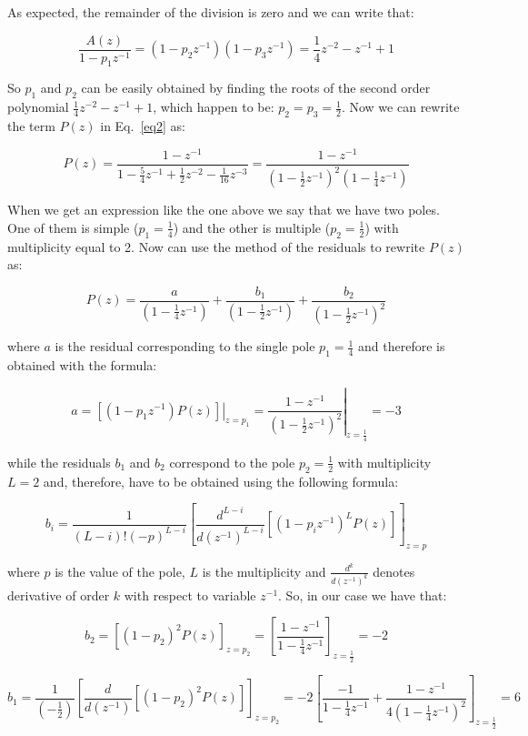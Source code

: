 \documentclass[a4paper,11pt,oneside]{article}
\begin{document}
As expected, the remainder of the division is zero and we can write that:

\[
\frac{A(z)}{1-p_1z^{-1}}=(1-p_{2}z^{-1})(1-p_{3}z^{-1})=\frac{1}{4}z^{-2}-z^{-1}+1
\]

So $p_1$ and $p_2$ can be easily obtained by finding the roots of the second order polynomial $\frac{1}{4}z^{-2}-z^{-1}+1$, which happen to be: $p_2=p_3=\frac{1}{2}$. Now we can rewrite the term $P(z)$ in Eq.~\ref{eq2} as:

\[
P(z)=\frac{1-z^{-1}}{1-\frac{5}{4}z^{-1}+\frac{1}{2}z^{-2}-\frac{1}{16}z^{-3}}=\frac{1-z^{-1}}{(1-\frac{1}{2}z^{-1})^2(1-\frac{1}{4}z^{-1})}
\]

When we get an expression like the one above we say that we have two poles. One of them is simple ($p_1=\frac{1}{4}$) and the other is multiple ($p_{2}=\frac{1}{2}$) with multiplicity equal to 2. Now can use the method of the residuals to rewrite $P(z)$ as:

\begin{equation}\label{fractionalexp}
P(z)=\frac{a}{(1-\frac{1}{4}z^{-1})}+\frac{b_1}{(1-\frac{1}{2}z^{-1})}+\frac{b_2}{(1-\frac{1}{2}z^{-1})^2}
\end{equation}

where $a$ is the residual corresponding to the single pole $p_1=\frac{1}{4}$ and therefore is obtained with the formula:

\[
a = \left.\left[(1-p_1z^{-1})P(z)\right]\right|_{z=p_1}=\left.\frac{1-z^{-1}}{(1-\frac{1}{2}z^{-1})^2}\right|_{z=\frac{1}{4}}=-3
\]

while the residuals $b_{1}$ and $b_{2}$ correspond to the pole $p_2=\frac{1}{2}$ with multiplicity $L=2$ and, therefore, have to be obtained using the following formula:

\[
b_{i} = \frac{1}{(L-i)!(-p)^{L-i}}\left[\frac{d^{L-i}}{d(z^{-1})^{L-i}}\left[(1-p_iz^{-1})^LP(z)\right]\right]_{z=p}
\]

where $p$ is the value of the pole, $L$ is the multiplicity and $\frac{d^k}{d(z^{-1})^k}$ denotes derivative of order $k$ with respect to variable $z^{-1}$. So, in our case we have that:

\[
b_2=\left[(1-p_2)^2P(z)\right]_{z=p_2}=\left[\frac{1-z^{-1}}{1-\frac{1}{4}z^{-1}}\right]_{z=\frac{1}{2}}=-2
\]

\[
b_1=\frac{1}{(-\frac{1}{2})}\left[\frac{d}{d(z^{-1})}\left[(1-p_2)^2P(z)\right]\right]_{z=p_2}=-2\left[\frac{-1}{1-\frac{1}{4}z^{-1}}+\frac{1-z^{-1}}{4(1-\frac{1}{4}z^{-1})^2}\right]_{z=\frac{1}{2}}=6
\]
\end{document}
